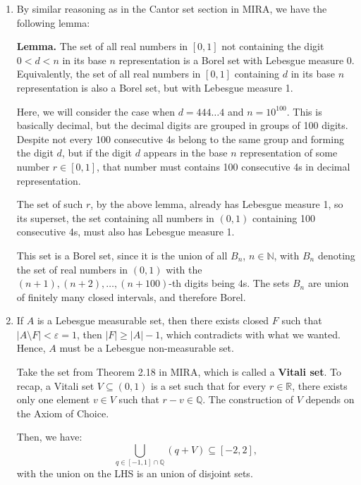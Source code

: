 \begin{enumerate}[label=\textbf{2D.\arabic*}]
  \item By similar reasoning as in the Cantor set section in MIRA, we have the
    following lemma:

    \textbf{Lemma.} The set of all real numbers in \( [0, 1] \) not containing
    the digit \( 0 < d < n \) in its base \( n \) representation is a Borel set
    with Lebesgue measure 0. Equivalently, the set of all real numbers in \( [0, 1] \)
    containing \( d \) in its base \( n \) representation is also a Borel set,
    but with Lebesgue measure 1.

    Here, we will consider the case when \( d = 444\ldots 4 \) and \( n =
    10^{100} \).
    This is basically decimal, but the decimal digits are grouped in groups of
    100 digits. Despite not every 100 consecutive 4s belong to the same group
    and forming the digit \( d \), but if the digit \( d \) appears in the base
    \( n \) representation of some number \( r \in [0, 1] \), that number must
    contains 100 consecutive 4s in decimal representation.

    The set of such \( r \), by the above lemma, already has Lebesgue measure 1,
    so its superset, the set containing all numbers in \( (0, 1) \) containing
    100 consecutive 4s, must also has Lebesgue measure 1.

    This set is a Borel set, since it is the union of all \( B_{n} \), \( n \in
    \mathbb{N}\), with \( B_{n} \) denoting the set of real numbers in \(
    (0, 1) \) with the \( (n+1), (n+2), \ldots, (n + 100) \)-th digits being \(
    4 \)s. The sets \( B_{n} \) are union of finitely many closed intervals, and
    therefore Borel.

    \item If \( A \) is a Lebesgue measurable set, then there exists closed \( F
      \) such that \( |A  \setminus F| < \varepsilon = 1 \), then \( |F| \ge |A|
      - 1\), which contradicts with what we wanted. Hence, \( A \) must be a
      Lebesgue non-measurable set.

      Take the set from Theorem 2.18 in MIRA, which is called a
      \textbf{Vitali set}. To recap, a Vitali set \( V \subseteq (0, 1) \) is a
      set such that for every \( r \in \mathbb{R} \), there exists only one
      element \( v \in V \)
      such that \( r - v \in \mathbb{Q} \). The construction of \( V \) depends
      on the Axiom of Choice.

      Then, we have:
      \[
        \bigcup_{q \in [-1, 1] \cap \mathbb{Q}} \left( q  + V  \right) \subseteq
        [-2, 2]
      ,\] with the union on the LHS is an union of disjoint sets.


\end{enumerate}
